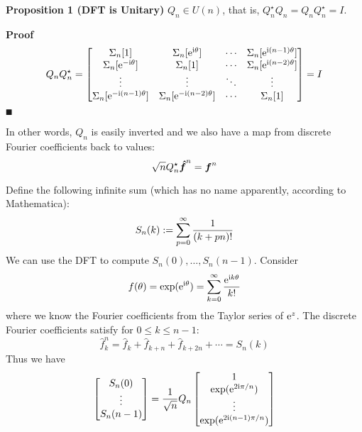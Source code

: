 \textbf{Proposition 1 (DFT is Unitary)} $Q_n \ensuremath{\in} U(n)$, that is, $Q_n^\ensuremath{\star} Q_n = Q_n Q_n^\ensuremath{\star} = I$.

\textbf{Proof}
\[
Q_n Q_n^\ensuremath{\star}  = \begin{bmatrix} \ensuremath{\Sigma}_n[1] & \ensuremath{\Sigma}_n[{\rm e}^{{\rm i} \ensuremath{\theta}}] & \ensuremath{\cdots} & \ensuremath{\Sigma}_n[{\rm e}^{{\rm i} (n-1) \ensuremath{\theta}}] \\
                            \ensuremath{\Sigma}_n[{\rm e}^{-{\rm i} \ensuremath{\theta}}] & \ensuremath{\Sigma}_n[1] & \ensuremath{\cdots} & \ensuremath{\Sigma}_n[{\rm e}^{{\rm i} (n-2) \ensuremath{\theta}}] \\
                            \ensuremath{\vdots} & \ensuremath{\vdots} & \ensuremath{\ddots} & \ensuremath{\vdots} \\
                            \ensuremath{\Sigma}_n[{\rm e}^{-{\rm i}(n-1) \ensuremath{\theta}}] & \ensuremath{\Sigma}_n[{\rm e}^{-{\rm i}(n-2) \ensuremath{\theta}}] & \ensuremath{\cdots} & \ensuremath{\Sigma}_n[1]
                            \end{bmatrix} = I
\]
\ensuremath{\QED}

In other words, $Q_n$ is easily inverted and we also have a map from discrete Fourier coefficients back to values:
\[
\sqrt{n} Q_n^\star {\mbox{\boldmath$\hat f$\unboldmath}}^n = \bm{{\mbox{\boldmath$f$\unboldmath}}}^n
\]
\begin{example} Define the following infinite sum (which has no name apparently, according to Mathematica):
\[
S_n(k) := \ensuremath{\sum}_{p=0}^\ensuremath{\infty} {1 \over (k+pn)!}
\]
We can use the DFT to compute $S_n(0), \ensuremath{\ldots}, S_n(n-1)$. Consider
\[
f(\ensuremath{\theta}) = \exp({\rm e}^{{\rm i} \ensuremath{\theta}}) = \ensuremath{\sum}_{k=0}^\ensuremath{\infty} {{\rm e}^{{\rm i} k \ensuremath{\theta}} \over k!}
\]
where we know the Fourier coefficients from the Taylor series of ${\rm e}^z$. The discrete Fourier coefficients satisfy for $0 \ensuremath{\leq} k \ensuremath{\leq} n-1$:
\[
\hat f_k^n = \hat f_k + \hat f_{k+n} + \hat f_{k+2n} + \ensuremath{\cdots} = S_n(k)
\]
Thus we have
\[
\begin{bmatrix}
S_n(0) \\
\ensuremath{\vdots} \\
S_n(n-1)
\end{bmatrix} = {1 \over \sqrt{n}} Q_n \begin{bmatrix} 1 \\
                                \exp({\rm e}^{2{\rm i} \ensuremath{\pi}/n}) \\
                                \ensuremath{\vdots} \\
                                \exp({\rm e}^{2{\rm i} (n-1) \ensuremath{\pi}/n}) \end{bmatrix}
\]
\end{example}

